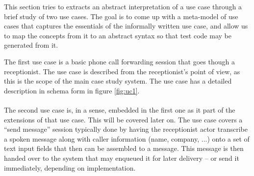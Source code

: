 This section tries to extracts an abstract interpretation of a use case through a brief study of two use cases. The goal is to come up with a meta-model of use cases that captures the essentials of the informally written use case, and allow us to map the concepts from it to an abstract syntax so that test code may be generated from it.

The first use case is a basic phone call forwarding session that goes though a receptionist. The use case is described from the receptionist's point of view, as this is the scope of the main case study system. The use case has a detailed description in schema form in figure \ref{fig:uc1}. \\\\
The second use case is, in a sense, embedded in the first one as it part of the extensions of that use case. This will be covered later on. The use case covers a ``send message'' session typically done by having the receptionist actor transcribe a spoken message along with caller information (name, company, ...) onto a set of text input fields that then can be assembled to a message. This message is then handed over to the system that may enqueued it for later delivery -- or send it immediately, depending on implementation.

